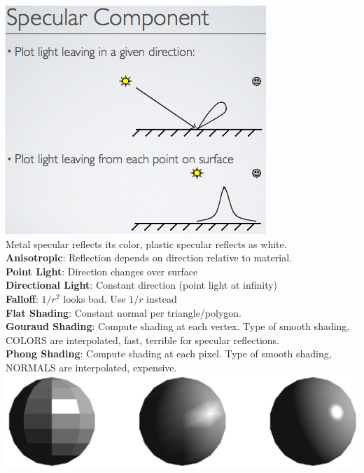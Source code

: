 \documentclass[3pt,landscape]{article}
\begin{document}
\begin{multicols}{3}
\includegraphics[scale=0.32]{images/specular}\\
Metal specular reflects its color, plastic specular reflects as white.\\
{\bf Anisotropic}: Reflection depends on direction relative to material.\\
{\bf Point Light}: Direction changes over surface\\
{\bf Directional Light}: Constant direction (point light at infinity)\\
{\bf Falloff}: \(1/r^2\) looks bad. Use \(1/r\) instead\\
{\bf Flat Shading}: Constant normal per triangle/polygon.\\
{\bf Gouraud Shading}: Compute shading at each vertex. Type of smooth shading, COLORS are interpolated, fast, terrible for specular reflections.\\
{\bf Phong Shading}: Compute shading at each pixel. Type of smooth shading, NORMALS are interpolated, expensive.\\
\includegraphics[scale=0.4]{images/shading}\\


\end{multicols}
\end{document}
